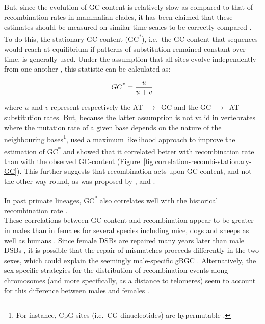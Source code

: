 But, since the evolution of GC-content is relatively slow as compared to that of recombination rates in mammalian clades, it has been claimed that these estimates should be measured on similar time scales to be correctly compared \citep{duret2009biased}.
To do this, the stationary GC-content (GC\textsuperscript{*}), i.e.\ the GC-content that sequences would reach at equilibrium if patterns of substitution remained constant over time, is generally used.
Under the assumption that all sites evolve independently from one another \citep{sueoka1962genetic}, this statistic can be calculated as:

\begin{equation*}
	GC\textsuperscript{*} = \frac{u}{u+v}
\end{equation*}

where $u$ and $v$ represent respectively the AT~$\rightarrow$~GC and the GC~$\rightarrow$~AT substitution rates.
But, because the latter assumption is not valid in vertebrates where the mutation rate of a given base depends on the nature of the neighbouring bases\footnote{For instance, CpG sites (i.e.\ CG dinucleotides) are hypermutable \citep{arndt2003distinct}.}, \citet{duret2008impact} used a maximum likelihood approach to improve the estimation of GC\textsuperscript{*} and showed that it correlated better with recombination rate than with the observed GC-content (Figure~\ref{fig:correlation-recombi-stationary-GC}). This further suggests that recombination acts upon GC-content, and not the other way round, as was proposed by \citet{gerton2000global}, \citet{blat2002physical} and \citet{petes2002context}.

In past primate lineages, GC\textsuperscript{*} also correlates well with the historical recombination rate \citep{munch2014finescale}.\\



These correlations between GC-content and recombination appear to be greater in males than in females for several species including mice, dogs and sheeps \citep{popa2012sexspecific} as well as humans \citep{webster2005maledriven, dreszer2007biased, duret2008impact}.
Since female DSBs are repaired many years later than male DSBs \citep{coop2007evolutionary}, it is possible that the repair of mismatches proceeds differently in the two sexes, which could explain the seemingly male-specific gBGC \citep{duret2009biased}.
Alternatively, the sex-specific strategies for the distribution of recombination events along chromosomes (and more specifically, as a distance to telomeres) seem to account for this difference between males and females \citep{popa2012sexspecific}.


